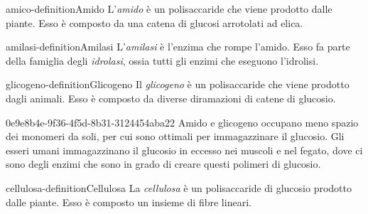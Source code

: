 \documentclass[preview]{standalone}
\begin{document}
\begin{snippetdefinition}{amico-definition}{Amido}
    L'\textit{amido} è un polisaccaride che viene prodotto dalle piante.
    Esso è composto da una catena di glucosi arrotolati ad elica.
\end{snippetdefinition}

\begin{snippetdefinition}{amilasi-definition}{Amilasi}
    L'\textit{amilasi} è l'enzima che rompe l'amido.
    Esso fa parte della famiglia degli \textit{idrolasi}, ossia tutti gli enzimi che
    eseguono l'idrolisi.
\end{snippetdefinition}

\begin{snippetdefinition}{glicogeno-definition}{Glicogeno}
    Il \textit{glicogeno} è un polisaccaride che viene prodotto dagli animali.
    Esso è composto da diverse diramazioni di catene di glucosio.
\end{snippetdefinition}

\begin{snippet}{0e9e8b4e-9f36-4f5d-8b31-3124454aba22}
    Amido e glicogeno occupano meno spazio dei monomeri da soli, per cui sono ottimali per immagazzinare
    il glucosio.
    Gli esseri umani immagazzinano il glucosio in eccesso nei muscoli e nel fegato, dove ci sono degli enzimi
    che sono in grado di creare questi polimeri di glucosio.
\end{snippet}

\begin{snippetdefinition}{cellulosa-definition}{Cellulosa}
    La \textit{cellulosa} è un polisaccaride di glucosio prodotto dalle piante.
    Esso è composto un insieme di fibre lineari.
\end{snippetdefinition}


\end{document}
